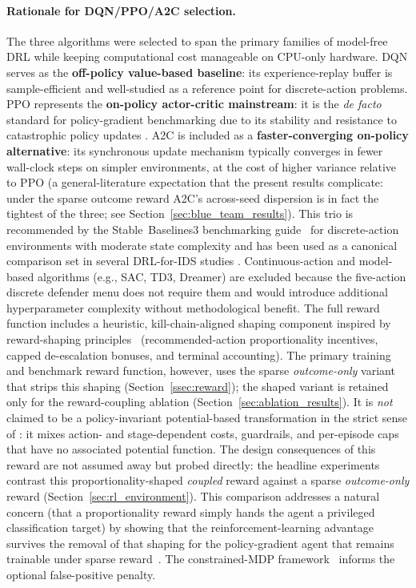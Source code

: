 \paragraph{Rationale for DQN/PPO/A2C selection.} The three algorithms were selected to span the primary families of model-free DRL while keeping computational cost manageable on CPU-only hardware. DQN serves as the \textbf{off-policy value-based baseline}: its experience-replay buffer is sample-efficient and well-studied as a reference point for discrete-action problems. PPO represents the \textbf{on-policy actor-critic mainstream}: it is the \emph{de facto} standard for policy-gradient benchmarking due to its stability and resistance to catastrophic policy updates \cite{Schulman2017}. A2C is included as a \textbf{faster-converging on-policy alternative}: its synchronous update mechanism typically converges in fewer wall-clock steps on simpler environments, at the cost of higher variance relative to PPO \cite{Mnih2016} (a general-literature expectation that the present results complicate: under the sparse outcome reward A2C's across-seed dispersion is in fact the tightest of the three; see Section~\ref{sec:blue_team_results}). This trio is recommended by the Stable~Baselines3 benchmarking guide~\cite{Raffin2021} for discrete-action environments with moderate state complexity and has been used as a canonical comparison set in several DRL-for-IDS studies \cite{Kheddar2024,Yang2024}. Continuous-action and model-based algorithms (e.g., SAC, TD3, Dreamer) are excluded because the five-action discrete defender menu does not require them and would introduce additional hyperparameter complexity without methodological benefit. The full reward function includes a heuristic, kill-chain-aligned shaping component inspired by reward-shaping principles~\cite{Ng1999} (recommended-action proportionality incentives, capped de-escalation bonuses, and terminal accounting). The primary training and benchmark reward function, however, uses the sparse \emph{outcome-only} variant that strips this shaping (Section~\ref{ssec:reward}); the shaped variant is retained only for the reward-coupling ablation (Section~\ref{sec:ablation_results}). It is \emph{not} claimed to be a policy-invariant potential-based transformation in the strict sense of : it mixes action- and stage-dependent costs, guardrails, and per-episode caps that have no associated potential function. The design consequences of this reward are not assumed away but probed directly: the headline experiments contrast this proportionality-shaped \emph{coupled} reward against a sparse \emph{outcome-only} reward (Section~\ref{sec:rl_environment}). This comparison addresses a natural concern (that a proportionality reward simply hands the agent a privileged classification target) by showing that the reinforcement-learning advantage survives the removal of that shaping for the policy-gradient agent that remains trainable under sparse reward~\cite{Amodei2016}. The constrained-MDP framework~\cite{Altman1999} informs the optional false-positive penalty.

